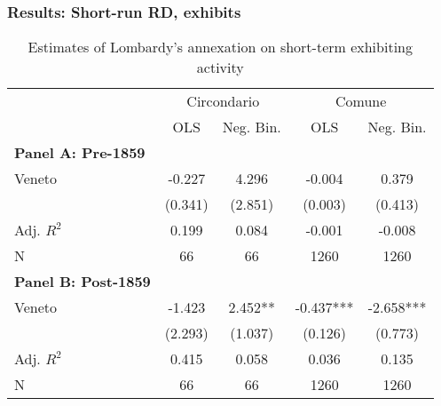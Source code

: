 \documentclass[10pt]{beamer}
\begin{document}
\begin{frame}
    \frametitle{Results: Short-run RD, exhibits}

        \begin{table}
        \centering
        \caption{Estimates of Lombardy's annexation on short-term exhibiting activity\label{tab:patent}}
            \begin{tabular}{lcccc}  %
            \toprule
            & \multicolumn{2}{c}{Circondario} & \multicolumn{2}{c}{Comune} \\ \cmidrule(lr){2-3}\cmidrule(lr){4-5}
            & OLS & Neg. Bin. & OLS  & Neg. Bin.  \\ \midrule %
            \textbf{Panel A: Pre-1859}  &&&& \\
            Veneto     & -0.227  & 4.296   & -0.004    & 0.379     \\
            & (0.341) & (2.851) & (0.003)   & (0.413)   \\
            Adj. $R^2$ & 0.199   & 0.084   & -0.001    & -0.008    \\
            N          & 66      & 66      & 1260      & 1260      \\ \midrule
            \textbf{Panel B: Post-1859} &&&& \\
            Veneto     & -1.423  & 2.452** & -0.437*** & -2.658*** \\
            & (2.293) & (1.037) & (0.126)   & (0.773)   \\
            Adj. $R^2$ & 0.415   & 0.058   & 0.036     & 0.135     \\
            N          & 66      & 66      & 1260      & 1260      \\
            \bottomrule
            \end{tabular}
        
        \end{table}

\end{frame}
\end{document}
